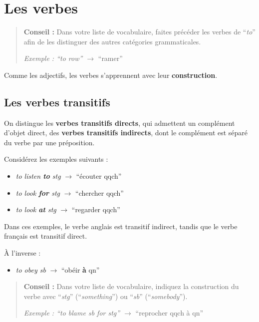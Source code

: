 \documentclass[
  10pt,
]{article}
\providecommand{\tightlist}{%
  \setlength{\itemsep}{0pt}\setlength{\parskip}{0pt}}
\begin{document}
\hypertarget{les-verbes}{%
\section{Les verbes}\label{les-verbes}}

\begin{quote}
\textbf{Conseil :} Dans votre liste de vocabulaire, faites précéder les verbes de ``\emph{to}'' afin de les distinguer des autres catégories grammaticales.

\emph{Exemple : ``to row'' \(\rightarrow\)} ``ramer''
\end{quote}

Comme les adjectifs, les verbes s'apprennent avec leur \textbf{construction}.

\hypertarget{les-verbes-transitifs}{%
\subsection{Les verbes transitifs}\label{les-verbes-transitifs}}

On distingue les \textbf{verbes transitifs directs}, qui admettent un complément d'objet direct, des \textbf{verbes transitifs indirects}, dont le complément
est séparé du verbe par une préposition.

Considérez les exemples suivants :

\begin{itemize}
\tightlist
\item
  \emph{to listen \textbf{to} stg} \(\rightarrow\) ``écouter qqch''
\item
  \emph{to look \textbf{for} stg} \(\rightarrow\) ``chercher qqch''
\item
  \emph{to look \textbf{at} stg} \(\rightarrow\) ``regarder qqch''
\end{itemize}

Dans ces exemples, le verbe anglais est transitif indirect, tandis que le verbe français est transitif direct.

À l'inverse :

\begin{itemize}
\tightlist
\item
  \emph{to obey sb} \(\rightarrow\) ``obéir \textbf{à} qn''
\end{itemize}

\begin{quote}
\textbf{Conseil :} Dans votre liste de vocabulaire, indiquez la construction du verbe avec ``\emph{stg}'' (``\emph{something}'') ou ``\emph{sb}'' (``\emph{somebody}'').

\emph{Exemple : ``to blame sb for stg'' \(\rightarrow\)} ``reprocher qqch à qn''
\end{quote}
\end{document}

